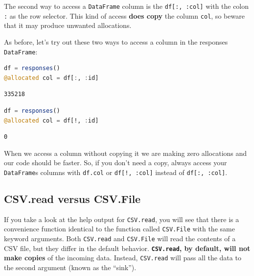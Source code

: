 \documentclass[
  notoc %
]{tufte-book}
\newcommand{\passthrough}[1]{#1}
\begin{document}
The second way to access a \passthrough{\lstinline!DataFrame!} column is
the \passthrough{\lstinline!df[:, :col]!} with the colon
\passthrough{\lstinline!:!} as the row selector. This kind of access
\textbf{does copy} the column \passthrough{\lstinline!col!}, so beware
that it may produce unwanted allocations.

As before, let's try out these two ways to access a column in the
responses \passthrough{\lstinline!DataFrame!}:

\begin{lstlisting}[language=Julia]
df = responses()
@allocated col = df[:, :id]
\end{lstlisting}

\begin{lstlisting}
335218
\end{lstlisting}

\begin{lstlisting}[language=Julia]
df = responses()
@allocated col = df[!, :id]
\end{lstlisting}

\begin{lstlisting}
0
\end{lstlisting}

When we access a column without copying it we are making zero
allocations and our code should be faster. So, if you don't need a copy,
always access your \passthrough{\lstinline!DataFrame!}s columns with
\passthrough{\lstinline!df.col!} or
\passthrough{\lstinline"df[!, :col]"} instead of
\passthrough{\lstinline!df[:, :col]!}.

\hypertarget{sec:df_performance_csv_read_file}{%
\subsection{CSV.read versus
CSV.File}\label{sec:df_performance_csv_read_file}}

If you take a look at the help output for
\passthrough{\lstinline!CSV.read!}, you will see that there is a
convenience function identical to the function called
\passthrough{\lstinline!CSV.File!} with the same keyword arguments. Both
\passthrough{\lstinline!CSV.read!} and
\passthrough{\lstinline!CSV.File!} will read the contents of a CSV file,
but they differ in the default behavior.
\textbf{\passthrough{\lstinline!CSV.read!}, by default, will not make
copies} of the incoming data. Instead,
\passthrough{\lstinline!CSV.read!} will pass all the data to the second
argument (known as the ``sink'').
\end{document}
